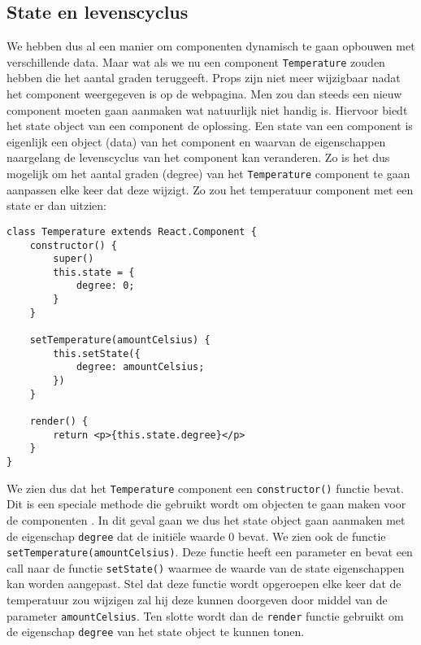\subsection{State en levenscyclus}
\label{subsec:state-en-levenscyclus}
We hebben dus al een manier om componenten dynamisch te gaan opbouwen met verschillende data. Maar wat als we nu een component \lstinline[basicstyle=\ttfamily\color{red}]|Temperature| zouden hebben die het aantal graden teruggeeft. Props zijn niet meer wijzigbaar nadat het component weergegeven is op de webpagina. Men zou dan steeds een nieuw component moeten gaan aanmaken wat natuurlijk niet handig is. Hiervoor biedt het state object van een component de oplossing. Een state van een component is eigenlijk een object (data) van het component en waarvan de eigenschappen naargelang de levenscyclus van het component kan veranderen. Zo is het dus mogelijk om het aantal graden (degree) van het \lstinline[basicstyle=\ttfamily\color{red}]|Temperature| component te gaan aanpassen elke keer dat deze wijzigt. Zo zou het temperatuur component met een state er dan uitzien:

\begin{lstlisting}[frame=single, caption=Het temperature component met de bijhorende state.]
class Temperature extends React.Component {
	constructor() {
		super()
		this.state = {
			degree: 0;
		}
	}
	
	setTemperature(amountCelsius) {
		this.setState({
			degree: amountCelsius;
		})
	}

	render() {
		return <p>{this.state.degree}</p>
	}
}
\end{lstlisting}

We zien dus dat het \lstinline[basicstyle=\ttfamily\color{red}]|Temperature| component een \lstinline[basicstyle=\ttfamily\color{red}]|constructor()| functie bevat. Dit is een speciale methode die gebruikt wordt om objecten te gaan maken voor de componenten \autocite{Chima2017}. In dit geval gaan we dus het state object gaan aanmaken met de eigenschap \lstinline[basicstyle=\ttfamily\color{red}]|degree| dat de initiële waarde 0 bevat. We zien ook de functie \lstinline[basicstyle=\ttfamily\color{red}]|setTemperature(amountCelsius)|. Deze functie heeft een parameter en bevat een call naar de functie \lstinline[basicstyle=\ttfamily\color{red}]|setState()| waarmee de waarde van de state eigenschappen kan worden aangepast. Stel dat deze functie wordt opgeroepen elke keer dat de temperatuur zou wijzigen zal hij deze kunnen doorgeven door middel van de parameter \lstinline[basicstyle=\ttfamily\color{red}]|amountCelsius|. Ten slotte wordt dan de \lstinline[basicstyle=\ttfamily\color{red}]|render| functie gebruikt om de eigenschap \lstinline[basicstyle=\ttfamily\color{red}]|degree|
van het state object te kunnen tonen.

